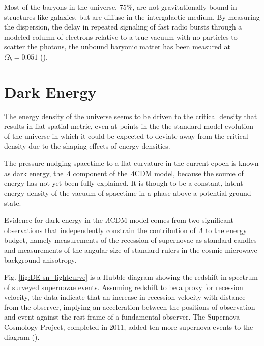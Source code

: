 \documentclass{paper}
\begin{document}
  Most of the baryons in the universe, 75\%, are not gravitationally bound in 
  structures like galaxies, but are diffuse in the intergalactic medium. By 
  measuring the dispersion, the delay in repeated signaling of fast radio 
  bursts through a modeled column of electrons relative to a true vacuum with 
  no particles to scatter the photons, the unbound baryonic matter has been 
  measured at \(\Omega_b = 0.051\) (\cite{2020Natur.581..391M}).


\section{Dark Energy}
  The energy density of the universe seems to be driven to the critical 
  density that results in flat spatial metric, even at points in the
  the standard model evolution of the universe in which it could be expected
  to deviate away from the critical density due to the shaping effects of 
  energy densities.

  The pressure nudging spacetime to a flat curvature in the current epoch is 
  known as dark energy, the $\Lambda$ component of the $\Lambda$CDM
  model, because the source of energy has not yet been fully explained. 
  It is though to be a constant, latent energy density of the vacuum of 
  spacetime in a phase above a potential ground state.

  Evidence for dark energy in the $\Lambda$CDM model comes from two 
  significant observations that independently constrain the contribution of 
  $\Lambda$ to the energy budget, namely measurements of the recession of 
  supernovae as standard candles and measurements of the angular size of 
  standard rulers in the cosmic microwave background anisotropy.

  Fig. \ref{fig:DE-sn_lightcurve} is a Hubble diagram showing the redshift in
  spectrum of surveyed supernovae events. Assuming redshift to be a proxy for
  recession velocity, the data indicate that an increase in recession 
  velocity with distance from the observer, implying an acceleration between
  the positions of observation and event against the rest frame of a
  fundamental observer. The Supernova Cosmology Project, completed in 2011, 
  added ten more supernova events to the diagram (\cite{2012ApJ...746...85S}).
\end{document}
